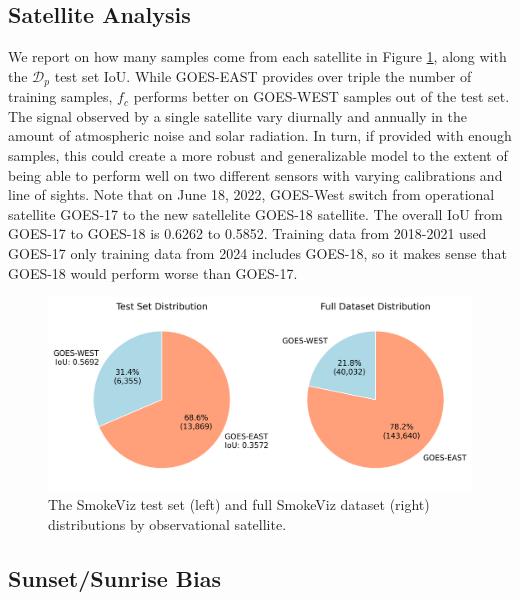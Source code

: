 \documentclass{article}
\begin{document}
\subsection{Satellite Analysis}


We report on how many samples come from each satellite in Figure \ref{sat_dataset}, along with the \(\mathcal{D}_p\) test set IoU. While GOES-EAST provides over triple the number of training samples, \(f_c\) performs better on GOES-WEST samples out of the test set. The signal observed by a single satellite vary diurnally and annually in the amount of atmospheric noise and solar radiation. In turn, if provided with enough samples, this could create a more robust and generalizable model to the extent of being able to perform well on two different sensors with varying calibrations and line of sights. Note that on June 18, 2022, GOES-West switch from operational satellite GOES-17 to the new satellelite GOES-18 satellite. The overall IoU from GOES-17 to GOES-18 is 0.6262 to 0.5852. Training data from 2018-2021 used GOES-17 only training data from 2024 includes GOES-18, so it makes sense that GOES-18 would perform worse than GOES-17. 

\begin{figure}[!htb]
    \centering
    \includegraphics[width=\linewidth]{stat_figs/satellite_test_full_dataset.png}
    \caption{The SmokeViz test set (left) and full SmokeViz dataset (right) distributions by observational satellite.}
    \label{sat_dataset}
\end{figure}

\subsection{Sunset/Sunrise Bias}
\end{document}
